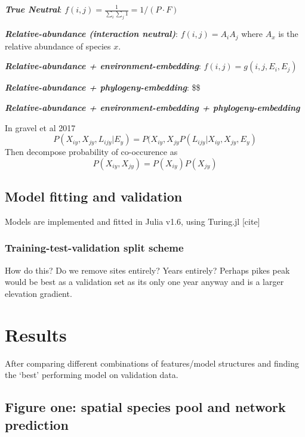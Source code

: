 \documentclass[11pt]{article}
\begin{document}
\textbf{\emph{True Neutral}}:
\(f(i,j) = \frac{1}{\sum_i \sum_j 1} = 1 / (P\cdot F)\)

\textbf{\emph{Relative-abundance (interaction neutral)}}:
\(f(i,j) = A_i A_j\) where \(A_x\) is the relative abundance of species
\(x\).

\textbf{\emph{Relative-abundance + environment-embedding}}:
\(f(i,j) = g(i,j, E_i, E_j)\)

\textbf{\emph{Relative-abundance + phylogeny-embedding}}: \$\$

\textbf{\emph{Relative-abundance + environment-embedding +
phylogeny-embedding}}

In gravel et al 2017
\[P(X_{iy}, X_{jy}, L_{ijy} | E_y) = P(X_{iy},X_{jy}P(L_{ijy} | X_{iy}, X_{jy}, E_y)\]
Then decompose probability of co-occurence as
\[P(X_{iy}, X_{jy}) = P(X_{iy})P(X_{jy})\]

\hypertarget{model-fitting-and-validation}{%
\subsection{Model fitting and
validation}\label{model-fitting-and-validation}}

Models are implemented and fitted in Julia v1.6, using Turing.jl
{[}cite{]}

\hypertarget{training-test-validation-split-scheme}{%
\subsubsection{Training-test-validation split
scheme}\label{training-test-validation-split-scheme}}

How do this? Do we remove sites entirely? Years entirely? Perhaps pikes
peak would be best as a validation set as its only one year anyway and
is a larger elevation gradient.

\hypertarget{results}{%
\section{Results}\label{results}}

After comparing different combinations of features/model structures and
finding the `best' performing model on validation data.

\hypertarget{figure-one-spatial-species-pool-and-network-prediction}{%
\subsection{Figure one: spatial species pool and network
prediction}\label{figure-one-spatial-species-pool-and-network-prediction}}
\end{document}
